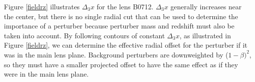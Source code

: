 Figure \ref{fieldrz} illustrates $\Delta_3 x$ for the lens B0712. $\Delta_3 x$ generally increases near the center, but there is no single radial cut that can be used to determine the importance of a perturber because perturber mass and redshift must also be taken into account. By following contours of constant $\Delta_3 x$, as illustrated in Figure \ref{fieldrz}, we can determine the effective radial offset for the perturber if it was in the main lens plane. Background perturbers are downweighted by ($1-\beta)^2$, so they must have a smaller projected offset to have the same effect as if they were in the main lens plane.